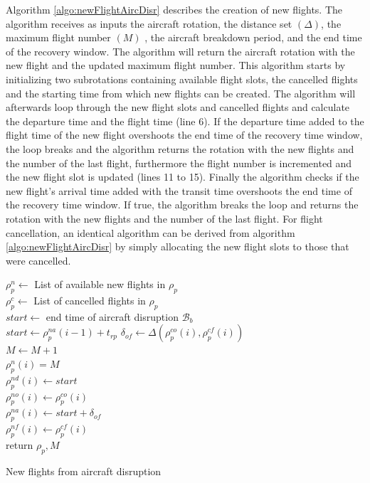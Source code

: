 	
	
	Algorithm \ref{algo:newFlightAircDisr} describes the creation of new flights. The algorithm receives as inputs the aircraft rotation, the distance set $(\Delta)$, the maximum flight number $(M)$ , the aircraft breakdown period, and the end time of the recovery window. The algorithm will return the aircraft rotation with the new flight and the updated maximum flight number. This algorithm starts by initializing two subrotations containing available flight slots, the cancelled flights and the starting time from which new flights can be created. The algorithm will afterwards loop through the new flight slots and cancelled flights and calculate the departure time and the flight time (line 6). If the departure time added to the flight time of the new flight overshoots the end time of the recovery time window, the loop breaks and the algorithm returns the rotation with the new flights and the number of the last flight, furthermore the flight number is incremented and the new flight slot is updated (lines 11 to 15). Finally the algorithm checks if the new flight's arrival time added with the transit time overshoots the end time of the recovery time window. If true, the algorithm breaks the loop  and returns the rotation with the new flights and the number of the last flight. For flight cancellation, an identical algorithm can be derived from algorithm \ref{algo:newFlightAircDisr} by simply allocating the new flight slots to those that were cancelled.\\
	
	\begin{algorithm}[]
		\DontPrintSemicolon
		
		$\rho^n_p \gets$ List of available new flights in $\rho_p$ \\
		$\rho^c_p \gets$ List of cancelled flights in $\rho_p$ \\
		$start \gets$ end time of aircraft disruption $\mathcal{B}_b$\\
		{
			 { $start \gets \rho^{na}_p(i-1)  + t_{rp}$}
			$\delta_{of} \gets \Delta(\rho^{co}_p(i), \rho^{cf}_p(i))$\\
			$M \gets M + 1$\\
			$\rho^n_p(i) = M$\\
			$\rho^{nd}_p(i) \gets start$ \\
			$\rho^{no}_p(i) \gets \rho^{co}_p(i)$\\
			$\rho^{na}_p(i) \gets start + \delta_{of}$\\
			$\rho^{nf}_p(i) \gets \rho^{cf}_p(i)$\\
		}
		return $\rho_p, M$
		\caption{New flights from aircraft disruption}
		\label{algo:newFlightAircDisr}
	\end{algorithm}


